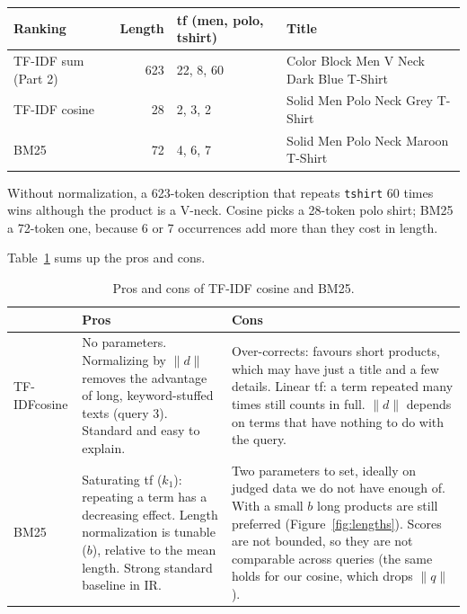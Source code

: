 \documentclass[10pt,a4paper]{article}
\begin{document}
\begin{table}[H]
\centering\small
\begin{tabular}{l r l l}
\toprule
Ranking & Length & tf (men, polo, tshirt) & Title \\
\midrule
TF-IDF sum (Part 2) & 623 & 22, 8, 60 & Color Block Men V Neck Dark Blue T-Shirt \\
TF-IDF cosine       & 28  & 2, 3, 2   & Solid Men Polo Neck Grey T-Shirt \\
BM25                & 72  & 4, 6, 7   & Solid Men Polo Neck Maroon T-Shirt \\
\bottomrule
\end{tabular}
\end{table}

Without normalization, a 623-token description that repeats \texttt{tshirt} 60 times wins although the
product is a V-neck. Cosine picks a 28-token polo shirt; BM25 a 72-token one, because 6 or 7 occurrences
add more than they cost in length.

Table~\ref{tab:proscons} sums up the pros and cons.

\begin{table}[htb]
\centering\small
\caption{Pros and cons of TF-IDF cosine and BM25.}
\label{tab:proscons}
\begin{tabular}{p{} p{} p{}}
\toprule
 & Pros & Cons \\
\midrule
TF-IDF\newline cosine &
No parameters. Normalizing by $\lVert d\rVert$ removes the advantage of long, keyword-stuffed texts
(query 3). Standard and easy to explain. &
Over-corrects: favours short products, which may have just a title and a few details. Linear tf: a term
repeated many times still counts in full. $\lVert d\rVert$ depends on terms that have nothing to do with
the query. \\
\addlinespace
BM25 &
Saturating tf ($k_1$): repeating a term has a decreasing effect. Length normalization is tunable ($b$),
relative to the mean length. Strong standard baseline in IR. &
Two parameters to set, ideally on judged data we do not have enough of. With a small $b$ long products
are still preferred (Figure~\ref{fig:lengths}). Scores are not bounded, so they are not comparable
across queries (the same holds for our cosine, which drops $\lVert q\rVert$). \\
\bottomrule
\end{tabular}
\end{table}
\end{document}
